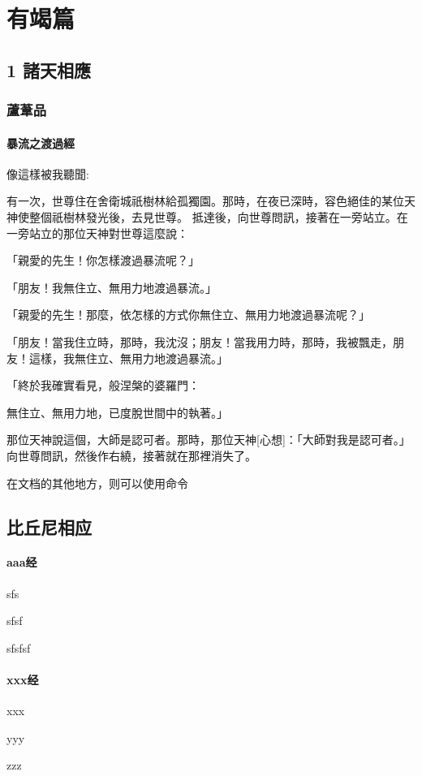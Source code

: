 \documentclass[a4paper,12pt,oneside]{book}
\begin{document}
\part*{有竭篇}

\chapter{1 諸天相應}

\section*{蘆葦品}

\subsection{暴流之渡過經}

像這樣被我聽聞:

有一次，世尊住在舍衛城祇樹林給孤獨園。那時，在夜已深時，容色絕佳的某位天神使整個祇樹林發光後，去見世尊。
抵達後，向世尊問訊，接著在一旁站立。在一旁站立的那位天神對世尊這麼說：

「親愛的先生！你怎樣渡過暴流呢？」

「朋友！我無住立、無用力地渡過暴流。」

「親愛的先生！那麼，依怎樣的方式你無住立、無用力地渡過暴流呢？」

「朋友！當我住立時，那時，我沈沒；朋友！當我用力時，那時，我被飄走，朋友！這樣，我無住立、無用力地渡過暴流。」

「終於我確實看見，般涅槃的婆羅門：

無住立、無用力地，已度脫世間中的執著。」

那位天神說這個，大師是認可者。那時，那位天神[心想]：「大師對我是認可者。」向世尊問訊，然後作右繞，接著就在那裡消失了。



在文档的其他地方，则可以使用命令


\chapter{比丘尼相应}
\subsection{aaa经}
\label{sn 3.9}

sfs

sfsf

sfsfsf

\subsection{xxx经}
xxx

yyy

zzz
\clearpage
\end{document}
